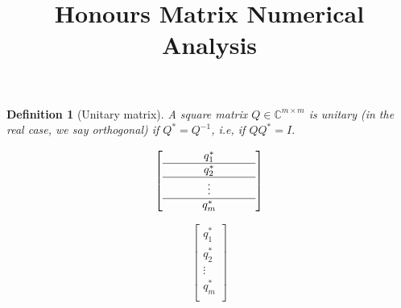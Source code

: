 \documentclass[12pt]{article}
\title{Honours Matrix Numerical Analysis}
\date{}
\theoremstyle{dotless}
\newtheorem*{definition}{Definition}
\begin{document}
\maketitle
\begin{definition}[Unitary matrix]
A square matrix $Q \in \mathbb{C}^{m \times m} $ is unitary (in the real case, we say orthogonal) if $Q^* = Q ^{-1}$, i.e, if $Q Q^* = I$. 

  \[
    \left[
    \begin{array}{>{\centering\arraybackslash}m{1in}}
      $q_1^*$ \\ \hline
      $q_2^*$\\ \hline
      $\vdots$ \\ \hline
      $q_m^*$ \\
    \end{array}
    \right]
  \]

  \[
    \left[
    \begin{array}{c}
       q_1^*  \\ \hline
      q_2^*\\ \hline
      \vdots \\ \hline
      q_m^* \\
    \end{array}
    \right]
  \]


\end{definition}
\end{document}
